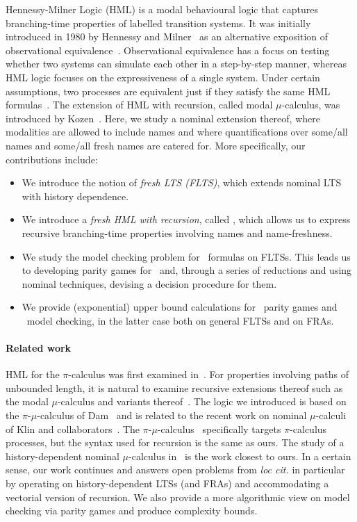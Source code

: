 Hennessy-Milner Logic (HML) is a modal behavioural logic that captures branching-time properties of labelled transition systems. It was initially introduced in 1980 by Hennessy and Milner~\cite{DBLP:conf/icalp/HennessyM80} as an alternative exposition of observational equivalence~\cite{BradfieldS07}. Observational equivalence has a focus on testing whether two systems can simulate each other in a step-by-step manner,
whereas HML logic focuses on the expressiveness of a single system. Under certain assumptions, two
processes are equivalent just if they satisfy the same HML formulas~\cite{JOB}. The extension of HML with
recursion, called modal $\mu$-calculus, was introduced by Kozen~\cite{Kozen83}.
Here, we study a nominal extension thereof, where modalities
are allowed to include names and where quantifications over some/all names and some/all fresh names are catered for.
More specifically, our contributions include:
\begin{itemize}
\item We introduce the notion of \emph{fresh LTS (FLTS)}, which extends nominal LTS with history dependence.
\item We introduce a \emph{fresh HML with recursion}, called \fhml, which allows us to express recursive branching-time properties involving names and name-freshness.
\item We study the model checking problem for \fhml\ formulas on FLTSs. This leads us to developing parity games for \fhml\ and, through a series of reductions and using nominal techniques, devising a decision procedure for them.
\item We provide (exponential) upper bound calculations for \fhml\ parity games and \fhml\ model checking, in the latter case both on  general FLTSs and on FRAs.
\end{itemize}

\paragraph*{Related work}
HML for the $\pi$-calculus was first examined in~\cite{MilnerPW93}. For properties involving paths
of unbounded length, it is natural to examine recursive extensions thereof such as the modal $\mu$-calculus
and variants thereof~\cite{BradfieldS07}. The logic we introduced is based on the $\pi$-$\mu$-calculus of Dam~\cite{Dam03} and is related to
the recent work on nominal $\mu$-calculi of Klin and collaborators~\cite{KlinL17,KlinL19,KlinHD}.
The $\pi$-$\mu$-calculus~\cite{Dam03} specifically targets $\pi$-calculus processes, but the syntax used for recursion is the same as ours.
The study of a history-dependent nominal $\mu$-calculus in~\cite{KlinHD} is the work closest to ours. In a certain sense, our work continues and answers open problems from \emph{loc cit.}
 in particular by operating on history-dependent LTSs (and FRAs) and accommodating a vectorial version of recursion.
We also provide a more algorithmic view on model checking via parity games and produce complexity bounds. 

